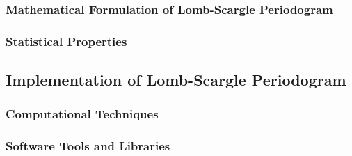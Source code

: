     		\subsubsection{Mathematical Formulation of Lomb-Scargle Periodogram}
    		
    		\subsubsection{Statistical Properties}
    	
    	\subsection{Implementation of Lomb-Scargle Periodogram}
    	
    		\subsubsection{Computational Techniques}
    		
    		\subsubsection{Software Tools and Libraries}
    	